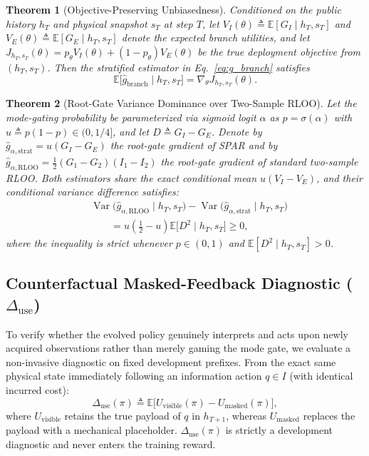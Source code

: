 \documentclass[11pt]{article}
\newtheorem{theorem}{Theorem}[section]
\theoremstyle{definition}
\theoremstyle{remark}
\newcommand{\prism}{\textsc{SPAR}}
\newcommand{\E}{\mathbb{E}}
\newcommand{\Var}{\operatorname{Var}}
\newcommand{\Duse}{\Delta_{\mathrm{use}}}
\newcommand{\gbranch}{\widehat{g}_{\mathrm{branch}}}
\begin{document}
\begin{theorem}[Objective-Preserving Unbiasedness]
\label{thm:unbiased}
Conditioned on the public history $h_T$ and physical snapshot $s_T$ at step $T$, let $V_I(\theta) \triangleq \E[G_I \mid h_T, s_T]$ and $V_E(\theta) \triangleq \E[G_E \mid h_T, s_T]$ denote the expected branch utilities, and let $J_{h_T, s_T}(\theta) = p_\theta V_I(\theta) + (1 - p_\theta)V_E(\theta)$ be the true deployment objective from $(h_T, s_T)$. Then the stratified estimator in Eq.~\eqref{eq:g_branch} satisfies
\begin{equation}
    \E\bigl[\gbranch \;\big|\; h_T, s_T\bigr] = \nabla_\theta J_{h_T, s_T}(\theta).
    \label{eq:thm_unbiased}
\end{equation}
\end{theorem}

\begin{theorem}[Root-Gate Variance Dominance over Two-Sample RLOO]
\label{thm:variance}
Let the mode-gating probability be parameterized via sigmoid logit $\alpha$ as $p = \sigma(\alpha)$ with $u \triangleq p(1-p) \in (0, 1/4]$, and let $D \triangleq G_I - G_E$. Denote by $\widehat{g}_{\alpha, \mathrm{strat}} = u(G_I - G_E)$ the root-gate gradient of \prism{} and by $\widehat{g}_{\alpha, \mathrm{RLOO}} = \frac{1}{2}(G_1 - G_2)(I_1 - I_2)$ the root-gate gradient of standard two-sample RLOO. Both estimators share the exact conditional mean $u(V_I - V_E)$, and their conditional variance difference satisfies:
\begin{align}
    &\Var\bigl(\widehat{g}_{\alpha, \mathrm{RLOO}} \mid h_T, s_T\bigr) - \Var\bigl(\widehat{g}_{\alpha, \mathrm{strat}} \mid h_T, s_T\bigr) \nonumber \\
    &\qquad = u\left(\frac{1}{2} - u\right)\E\bigl[D^2 \mid h_T, s_T\bigr] \ge 0,
    \label{eq:thm_variance}
\end{align}
where the inequality is strict whenever $p \in (0, 1)$ and $\E[D^2 \mid h_T, s_T] > 0$.
\end{theorem}

\subsection{Counterfactual Masked-Feedback Diagnostic ($\Duse$)}
\label{subsec:delta_use}
To verify whether the evolved policy genuinely interprets and acts upon newly acquired observations rather than merely gaming the mode gate, we evaluate a non-invasive diagnostic on fixed development prefixes. From the exact same physical state immediately following an information action $q \in I$ (with identical incurred cost):
\begin{equation}
    \Duse(\pi) \triangleq \E\bigl[U_{\mathrm{visible}}(\pi) - U_{\mathrm{masked}}(\pi)\bigr],
    \label{eq:delta_use}
\end{equation}
where $U_{\mathrm{visible}}$ retains the true payload of $q$ in $h_{T+1}$, whereas $U_{\mathrm{masked}}$ replaces the payload with a mechanical placeholder. $\Duse(\pi)$ is strictly a development diagnostic and never enters the training reward.
\end{document}
